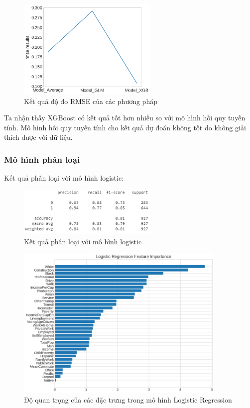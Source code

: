 \documentclass[14pt, a4paper]{article}
\numberwithin{equation}{section}
\numberwithin{figure}{section}
\numberwithin{dl}{section}
\numberwithin{md}{section}
\numberwithin{bd}{section}
\numberwithin{dn}{section}
\numberwithin{hq}{section}
\begin{document}
    \begin{figure}[h!]
        \centering
        \includegraphics[width=0.6\textwidth]{figures/Regression_Model_Result_RMSE.png}
        \caption{Kết quả độ đo RMSE của các phương pháp}
    \end{figure}

    Ta nhận thấy XGBoost có kết quả tốt hơn nhiều so với mô hình hồi quy tuyến tính.
    Mô hình hồi quy tuyến tính cho kết quả dự đoán không tốt do không giải thích được với dữ liệu.

    \subsubsection{Mô hình phân loại}

    Kết quả phân loại với mô hình logistic:

    \begin{figure}[h!]
        \centering
        \includegraphics[width=0.6\textwidth]{figures/Logistic_Regression_Report.png}
        \caption{Kết quả phân loại với mô hình logistic}
    \end{figure}

    \begin{figure}[h!]
        \centering
        \includegraphics[width=0.9\textwidth]{figures/Logistic_Regression_Feature_Importance.png}
        \caption{Độ quan trọng của các đặc trưng trong mô hình Logistic Regression}
    \end{figure}
\end{document}
